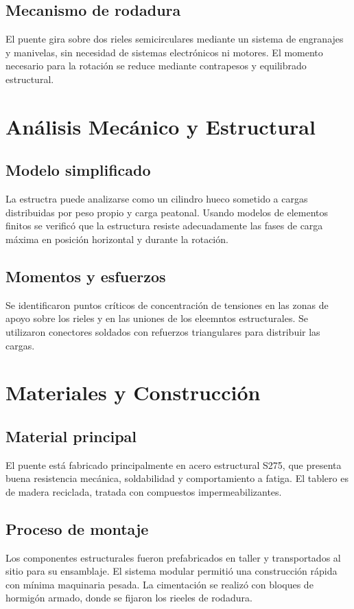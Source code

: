 \documentclass{IEEEtran}
\begin{document}
\subsection{Mecanismo de rodadura}
El puente gira sobre dos rieles semicirculares mediante un sistema de engranajes y manivelas, sin necesidad de sistemas electrónicos ni motores. El momento necesario para la rotación se reduce mediante contrapesos y equilibrado estructural.

\section{Análisis Mecánico y Estructural}
\subsection{Modelo simplificado}
La estructra puede analizarse como un cilindro hueco sometido a cargas distribuidas por peso propio y carga peatonal. Usando modelos de elementos finitos se verificó que la estructura resiste adecuadamente las fases de carga máxima en posición horizontal y durante la rotación.

\subsection{Momentos y esfuerzos}
Se identificaron puntos críticos de concentración de tensiones en las zonas de apoyo sobre los rieles y en las uniones de los eleemntos estructurales. Se utilizaron conectores soldados con refuerzos triangulares para distribuir las cargas.

\section{Materiales y Construcción}
\subsection{Material principal}
El puente está fabricado principalmente en acero estructural S275, que presenta buena resistencia mecánica, soldabilidad y comportamiento a fatiga. El tablero es de madera reciclada, tratada con compuestos impermeabilizantes.

\subsection{Proceso de montaje}
Los componentes estructurales fueron prefabricados en taller y transportados al sitio para su ensamblaje. El sistema modular permitió una construcción rápida con mínima maquinaria pesada. La cimentación se realizó con bloques de hormigón armado, donde se fijaron los rieeles de rodadura.
\end{document}
